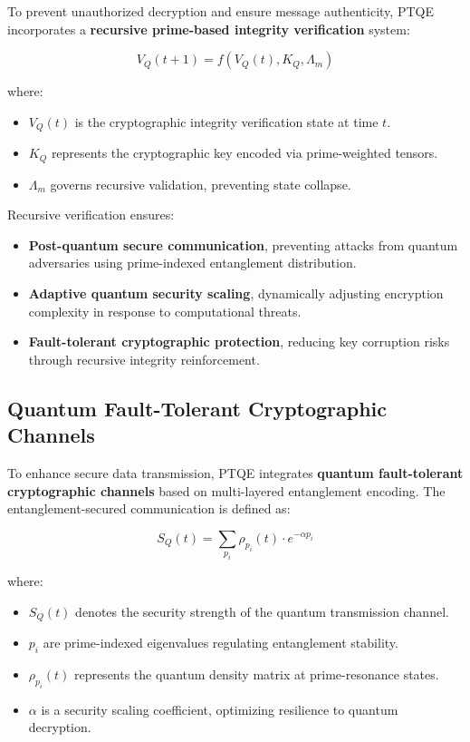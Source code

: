\documentclass{article}
\theoremstyle{plain}
\begin{document}
To prevent unauthorized decryption and ensure message authenticity, PTQE incorporates a \textbf{recursive prime-based integrity verification} system:

\begin{equation}
    V_Q (t+1) = f(V_Q (t), K_Q, \Lambda_m)
\end{equation}

where:
\begin{itemize}
    \item \( V_Q (t) \) is the cryptographic integrity verification state at time \( t \).
    \item \( K_Q \) represents the cryptographic key encoded via prime-weighted tensors.
    \item \( \Lambda_m \) governs recursive validation, preventing state collapse.
\end{itemize}

Recursive verification ensures:
\begin{itemize}
    \item \textbf{Post-quantum secure communication}, preventing attacks from quantum adversaries using prime-indexed entanglement distribution.
    \item \textbf{Adaptive quantum security scaling}, dynamically adjusting encryption complexity in response to computational threats.
    \item \textbf{Fault-tolerant cryptographic protection}, reducing key corruption risks through recursive integrity reinforcement.
\end{itemize}

\subsection{Quantum Fault-Tolerant Cryptographic Channels}

To enhance secure data transmission, PTQE integrates \textbf{quantum fault-tolerant cryptographic channels} based on multi-layered entanglement encoding. The entanglement-secured communication is defined as:

\begin{equation}
    S_Q (t) = \sum_{p_i} \rho_{p_i}(t) \cdot e^{- \alpha p_i}
\end{equation}

where:
\begin{itemize}
    \item \( S_Q (t) \) denotes the security strength of the quantum transmission channel.
    \item \( p_i \) are prime-indexed eigenvalues regulating entanglement stability.
    \item \( \rho_{p_i}(t) \) represents the quantum density matrix at prime-resonance states.
    \item \( \alpha \) is a security scaling coefficient, optimizing resilience to quantum decryption.
\end{itemize}
\end{document}
